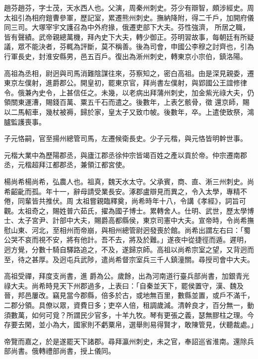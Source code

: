 \begin{pinyinscope}
 趙芬趙芬，字士茂，天水西人也。父演，周秦州刺史。芬少有辯智，頗涉經史。周太祖引為相府鎧曹參軍，歷記室，累遷熊州刺史。撫納降附，得二千戶，加開府儀同三司。大塚宰宇文護召為中外府掾，俄遷吏部下大夫。芬性強濟，
 所居之職，皆有聲績。武帝親總萬機，拜內史下大夫，轉少御正。芬明習故事，每朝廷有所疑議，眾不能決者，芬輒為評斷，莫不稱善。後為司會，申國公李穆之討齊也，引為行軍長史，封淮安縣男，邑五百戶。復出為淅州刺史，轉東京小宗伯，鎮洛陽。



 高祖為丞相，尉迥與司馬消難陰謀往來，芬察知之，密白高祖。由是深見親委，遷東京左僕射，進爵郡公。開皇初，罷東京官，拜尚書左僕射，與郢國公王誼修律令。俄兼內史令，上甚信任之。未幾，以老病出拜蒲州刺史，加金紫光祿大夫，仍領關東運漕，賜錢百萬、粟五千石而遣之。後數年，上表乞骸骨，徵
 還京師，賜以二馬軺車，幾杖被褥，歸於家，皇太子又致巾帔。後數年，卒。上遣使致祭，鴻臚監護喪事。



 子元恪嗣，官至揚州總管司馬，左遷候衛長史。少子元楷，與元恪皆明幹世事。



 元楷大業中為歷陽郡丞，與廬江郡丞徐仲宗皆竭百姓之產以貢於帝。仲宗遷南郡丞，元楷超拜江都郡丞，兼領江都宮使。



 楊尚希楊尚希，弘農人也。祖真，魏天水太守。父承賓，商、直、淅三州刺史。尚希齠齔而孤。年十一，辭母請受業長安。涿郡盧辯見而異之，令入太學，專精不倦，同輩皆共推伏。周
 太祖嘗親臨釋奠，尚希時年十八，令講《孝經》，詞旨可觀。太祖奇之，賜姓普六茹氏，擢為國子博士。累轉舍人。仕明、武世，歷太學博士、太子宮尹、計部中大夫，賜爵高都縣侯，東京司憲中大夫。宣帝時，令尚希撫慰山東、河北，至相州而帝崩，與相州總管尉迥發喪於館。尚希出謂左右曰：「蜀公哭不哀而視不安，將有他計。吾不去，將及於難。」遂夜中從捷徑而遁。遲明，迥方覺，分數十騎自驛路追之，不及，遂歸京師。高祖以尚希宗室之望，又背迥而至，待之甚厚。及迥屯兵武陟，遣尚希督宗室兵三千人鎮潼關。尋授司會中大夫。



 高祖受禪，拜度支尚書，進
 爵為公。歲餘，出為河南道行臺兵部尚書，加銀青光祿大夫。尚希時見天下州郡過多，上表曰：「自秦並天下，罷侯置守，漢、魏及晉，邦邑屢改。竊見當今郡縣，倍多於古，或地無百里，數縣並置，或戶不滿千，二郡分領。具僚以眾，資費日多；吏卒人倍，租調歲減。清幹良才，百分無一，動須數萬，如何可覓？所謂民少官多，十羊九牧。琴有更張之義，瑟無膠柱之理。今存要去閑，並小為大，國家則不虧粟帛，選舉則易得賢才，敢陳管見，伏聽裁處。」



 帝覽而嘉之，於是遂罷天下諸郡。尋拜瀛州刺史，未之官，奉詔巡省淮南。還除兵部尚書。俄轉禮部尚書，授上儀同。




\end{pinyinscope}
